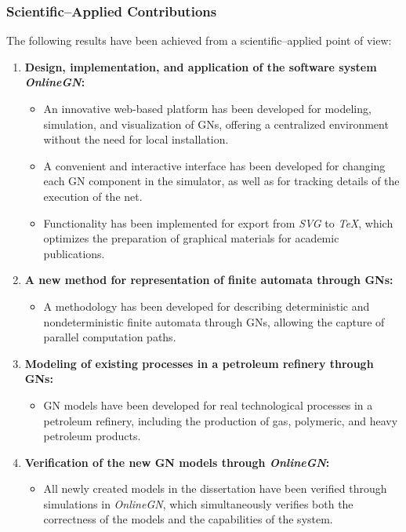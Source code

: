 	\subsubsection*{Scientific--Applied Contributions}
	
	The following results have been achieved from a scientific--applied point of view:
	
	\begin{enumerate}[label=\arabic*., leftmargin=*]
		\item \textbf{Design, implementation, and application of the software system \textit{OnlineGN}:}
		\begin{itemize}
			\item An innovative web-based platform has been developed for modeling, simulation, and visualization of GNs, offering a centralized environment without the need for local installation.
			\item A convenient and interactive interface has been developed for changing each GN component in the simulator, as well as for tracking details of the execution of the net.
			\item Functionality has been implemented for export from \textit{SVG} to \textit{TeX}, which optimizes the preparation of graphical materials for academic publications.
		\end{itemize}
		
		\item \textbf{A new method for representation of finite automata through GNs:}
		\begin{itemize}
			\item A methodology has been developed for describing deterministic and nondeterministic finite automata through GNs, allowing the capture of parallel computation paths.
		\end{itemize}
		
		\item \textbf{Modeling of existing processes in a petroleum refinery through GNs:}
		\begin{itemize}
			\item GN models have been developed for real technological processes in a petroleum refinery, including the production of gas, polymeric, and heavy petroleum products.
		\end{itemize}
		
		\item \textbf{Verification of the new GN models through \textit{OnlineGN}:}
		\begin{itemize}
			\item All newly created models in the dissertation have been verified through simulations in \textit{OnlineGN}, which simultaneously verifies both the correctness of the models and the capabilities of the system.
		\end{itemize}
	\end{enumerate}
	
